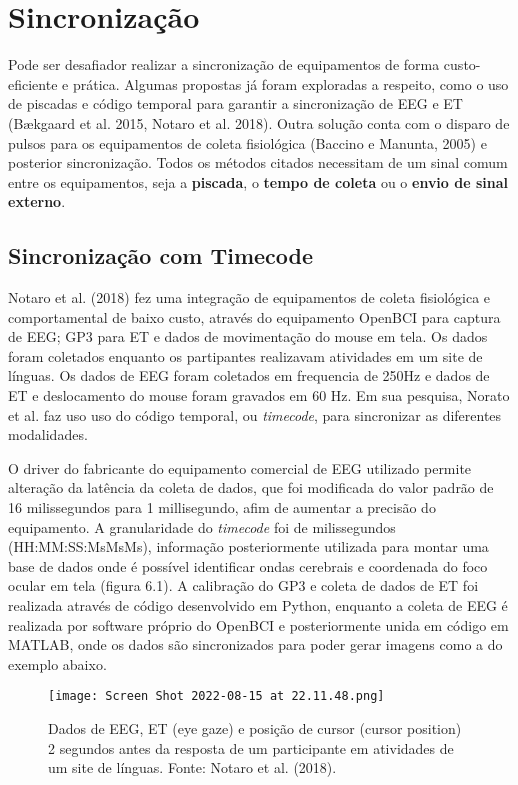 \chapter{Sincronização}

Pode ser desafiador realizar a sincronização de equipamentos
de forma custo-eficiente e prática. Algumas propostas já foram exploradas a respeito, 
como o uso de piscadas e código temporal para garantir a sincronização de EEG e ET 
(Bækgaard et al. 2015, Notaro et al. 2018). Outra solução
conta com o disparo de pulsos para os equipamentos de coleta fisiológica 
(Baccino e Manunta, 2005) e posterior sincronização. Todos os métodos citados necessitam de um
sinal comum entre os equipamentos, seja a \textbf{piscada}, o \textbf{tempo de coleta} ou
 o \textbf{envio de sinal externo}.


\section{Sincronização com Timecode}
Notaro et al. (2018) fez uma integração de equipamentos de coleta fisiológica e comportamental de 
baixo custo, através do equipamento OpenBCI para captura de EEG; GP3 para ET e dados 
de movimentação do mouse em tela. Os dados foram coletados enquanto os partipantes realizavam atividades em um 
site de línguas. Os dados de EEG foram coletados em frequencia de 250Hz e dados de ET e deslocamento
do mouse foram gravados em 60 Hz. Em sua pesquisa, Norato et al.  faz uso uso do código temporal, ou \textit{timecode}, 
para sincronizar as diferentes modalidades. 

O driver do fabricante do equipamento 
comercial de EEG utilizado permite alteração da latência da coleta de dados, que
foi modificada do valor padrão de 16 milissegundos para 1 millisegundo, afim de aumentar a precisão do 
equipamento. A granularidade do \textit{timecode} foi de milissegundos (HH:MM:SS:MsMsMs), informação posteriormente utilizada
para montar uma base de dados onde é possível identificar ondas cerebrais e coordenada do foco ocular em tela (figura 6.1). 
A calibração do GP3 e coleta de dados de ET foi realizada através de código desenvolvido em Python, enquanto a
coleta de EEG é realizada por software próprio do OpenBCI e posteriormente unida em código em MATLAB, onde os dados são
sincronizados para poder gerar imagens como a do exemplo abaixo. 


\begin{figure}[!h]
    \centering
    \texttt{[image: Screen Shot 2022-08-15 at 22.11.48.png]}
    \caption{Dados de EEG, ET (eye gaze) e posição de cursor (cursor position) 2 segundos antes da resposta de um participante em atividades de um site de línguas. 
    Fonte: Notaro et al. (2018).}
\end{figure}


